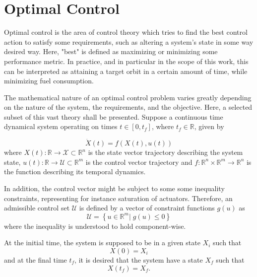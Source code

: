 \section{Optimal Control}

Optimal control is the area of control theory which tries to find the best control action to satisfy some requirements, such as altering a system's state in some way desired way. Here, "best" is defined as maximizing or minimizing some performance metric. In practice, and in particular in the scope of this work, this can be interpreted as attaining a target orbit in a certain amount of time, while minimizing fuel consumption.

The mathematical nature of an optimal control problem varies greatly depending on the nature of the system, the requirements, and the objective. Here, a selected subset of this vast theory shall be presented. Suppose a continuous time dynamical system operating on times \(t \in [0, t_f]\), where \(t_f \in \mathbb{R}\), given by

\begin{equation} \label{eq:generic_dyn}
    \dot X(t) = f(X(t), u(t))
\end{equation}
where \(X(t): \mathbb{R} \rightarrow \mathcal{X} \subset \mathbb{R}^n\) is the state vector trajectory describing the system state, \(u(t): \mathbb{R} \rightarrow \mathcal{U} \subset \mathbb{R}^m\) is the control vector trajectory and \(f: \mathbb{R}^n \times \mathbb{R}^m \rightarrow \mathbb{R}^n\) is the function describing its temporal dynamics. 

In addition, the control vector might be subject to some some inequality constraints, representing for instance saturation of actuators. Therefore, an admissible control set \(\mathcal{U}\) is defined by a vector of constraint functions \(g(u)\) as
\begin{equation}
    \mathcal{U} = \left\{u \in \mathbb{R}^m |\; g(u) \leq 0\right\}
\end{equation}
where the inequality is understood to hold component-wise.

At the initial time, the system is supposed to be in a given state \(X_i\) such that 
\begin{equation} \label{eq:generic_initial_constraint}
    X(0) = X_i
\end{equation}
and at the final time \(t_f\), it is desired that the system have a state \(X_f\) such that
\begin{equation} \label{eq:generic_final_constraint}
    X(t_f) = X_f.
\end{equation}

